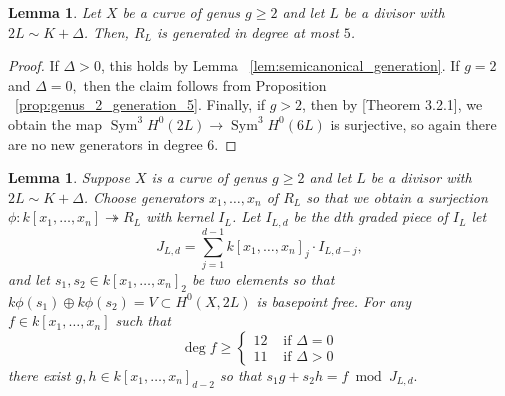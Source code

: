 \documentclass{amsart}
\theoremstyle{plain}
\newtheorem{lem}[thm]{Lemma}
\theoremstyle{definition}
\theoremstyle{remark}
\numberwithin{equation}{section}
\DeclareMathOperator{\sym}{Sym}
\begin{document}
\begin{lem}
\label{lem:generation_5}
Let $X$ be a curve of genus $g \geq 2$ and let $L$ be a divisor with $2 L \sim K +\Delta$. Then, $R_L$ is generated in degree at most $5$.
\end{lem}
\begin{proof}
If $\Delta > 0$, this holds by Lemma ~\ref{lem:semicanonical_generation}. If $g = 2$ and $\Delta = 0,$ then the claim follows from
Proposition ~\ref{prop:genus_2_generation_5}. Finally, if $g > 2$, then by \cite{vzb:stacky}[Theorem 3.2.1], we obtain the map $\sym^3 H^0(2L) \rightarrow \sym^3 H^0(6L)$ is surjective, so again there are no new generators in degree 6.
\end{proof}

\begin{lem}
\label{lem:reducing_degree}
Suppose $X$ is a curve of genus $g \geq 2$ and let $L$ be a divisor with $2L \sim K+\Delta$. Choose generators $x_1, \ldots, x_n$ of $R_L$ so that we obtain a surjection $\phi:k[x_1, \ldots, x_n] \twoheadrightarrow R_L$ with kernel $I_L$. Let $I_{L,d}$ be the $d$th graded piece of $I_L$ let 
$$J_{L,d} = \sum_{j = 1}^{d- 1}k[x_1, \ldots, x_n]_j \cdot I_{L,d-j},$$
and let $s_1,s_2 \in k[x_1, \ldots, x_n]_2$ be two elements so that $k\phi(s_1) \oplus k\phi(s_2) = V \subset H^0(X,2L)$ is basepoint free.
For any $f \in k[x_1, \ldots, x_n]$ such that
$$
\deg f \geq \begin{cases}
	12 &\text{ if }\Delta = 0\\
	11 &\text{ if }\Delta > 0
\end{cases}$$
there exist $g,h \in k[x_1, \ldots, x_n]_{d-2}$ so that $s_1g + s_2h = f \bmod J_{L,d}.$
\end{lem}
\end{document}
